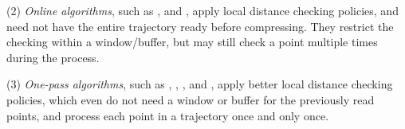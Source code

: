 \sstab (2) {\em Online algorithms}, such as \opwa \cite{Meratnia:Spatiotemporal}, \squishe \cite{Muckell:Compression} and \bqsa \cite{Liu:BQS}, apply local distance checking policies, and need not have the entire trajectory ready before compressing. They restrict the checking within a window/buffer, but may still check a point  multiple times during the process.

\sstab (3) {\em One-pass algorithms}, such as \operb\cite{Lin:Operb}, \siped \cite{Williams:Longest,Sklansky:Cone,Dunham:Cone, Zhao:Sleeve}, \cised \cite{Lin:Cised}, \intersec\cite{Long:Direction} and \interval \cite{Ke:Interval}, apply better local distance checking policies, which even do not need a window or buffer for the previously read points, and process each point in a trajectory once and only once.




